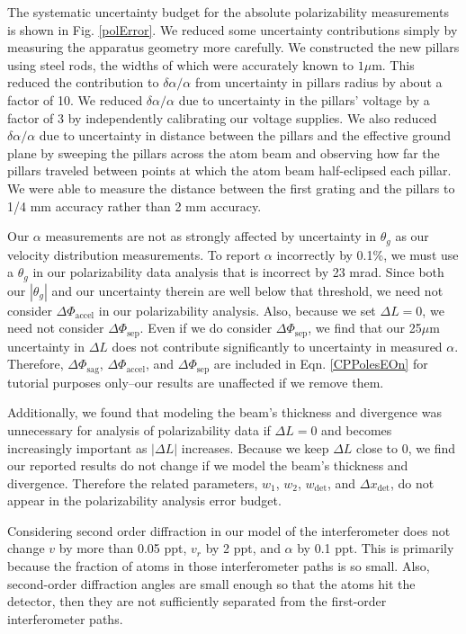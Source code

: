 \documentclass[twocolumn,prl,showpacs,superscriptaddress]{revtex4-1}   %
\newcommand{\figref}[1]{Fig. \ref{#1}}
\newcommand{\eqnref}[1]{Eqn. \eqref{#1}}
\newcommand{\dphisep}{\Delta\Phi_{\mathrm{sep}}}
\newcommand{\dphisag}{\Delta\Phi_{\mathrm{sag}}}
\newcommand{\dphiaccel}{\Delta\Phi_{\mathrm{accel}}}
\begin{document}
The systematic uncertainty budget for the absolute polarizability measurements is shown in \figref{polError}. We reduced some uncertainty contributions simply by measuring the apparatus geometry more carefully.
We constructed the new pillars using steel rods, the widths of which were accurately known to $1 \mu \text{m}$. This reduced the contribution to $\delta\alpha/\alpha$ from uncertainty in pillars radius by about a factor of 10.
We reduced $\delta\alpha/\alpha$ due to uncertainty in the pillars' voltage by a factor of 3 by independently calibrating our voltage supplies. We also reduced $\delta\alpha/\alpha$ due to uncertainty in distance between the pillars and the effective ground plane by sweeping the pillars across the atom beam and observing how far the pillars traveled between points at which the atom beam half-eclipsed each pillar. We were able to measure the distance between the first grating and the pillars to 1/4 mm accuracy rather than 2 mm accuracy. 

Our $\alpha$ measurements are not as strongly affected by uncertainty in $\theta_g$ as our velocity distribution measurements. To report $\alpha$ incorrectly by 0.1\%, we must use a $\theta_g$ in our polarizability data analysis that is incorrect by 23 mrad. Since both our $|\theta_g|$ and our uncertainty therein are well below that threshold, we need not consider $\dphiaccel$ in our polarizability analysis.
Also, because we set $\Delta L = 0$, we need not consider $\dphisep$.
Even if we do consider $\dphisep$, we find that our 25$\mu$m uncertainty in $\Delta L$ does not contribute significantly to uncertainty in measured $\alpha$.
Therefore, $\dphisag$, $\dphiaccel$, and $\dphisep$ are included in \eqnref{CPPolesEOn} for tutorial purposes only--our results are unaffected if we remove them.

Additionally, we found that modeling the beam's thickness and divergence was unnecessary for analysis of polarizability data if $\Delta L = 0$ and becomes increasingly important as $|\Delta L|$ increases. Because we keep $\Delta L$ close to 0, we find our reported results do not change if we model the beam's thickness and divergence.
Therefore the related parameters, $w_1$, $w_2$, $w_{\mathrm{det}}$, and $\Delta x_{\mathrm{det}}$, do not appear in the polarizability analysis error budget.

Considering second order diffraction in our model of the interferometer does not change $v$ by more than 0.05 ppt, $v_r$ by 2 ppt, and $\alpha$ by 0.1 ppt. This is primarily because the fraction of atoms in those interferometer paths is so small. Also, second-order diffraction angles are small enough so that the atoms hit the detector, then they are not sufficiently separated from the first-order interferometer paths.
\end{document}
